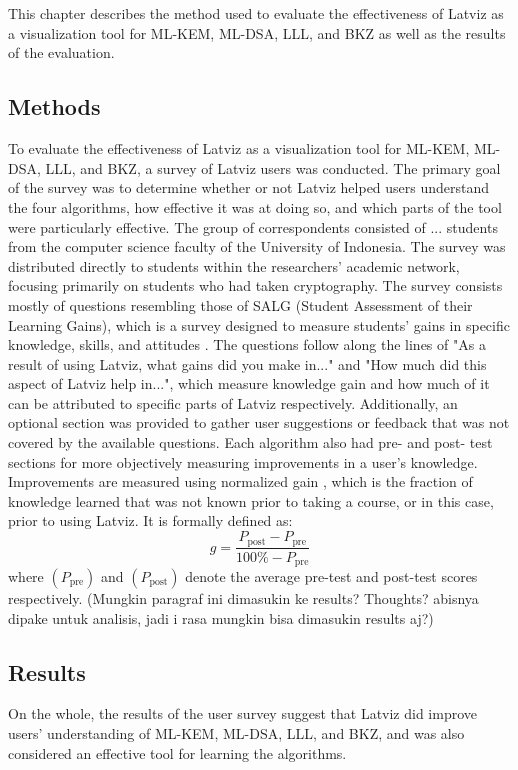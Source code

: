 \chapter{\babEmpat}
\label{bab:4}
This chapter describes the method used to evaluate the effectiveness of Latviz as a visualization tool for ML-KEM, ML-DSA, LLL, and BKZ as well as the results of the evaluation.

\section{Methods}
 To evaluate the effectiveness of Latviz as a visualization tool for ML-KEM, ML-DSA, LLL, and BKZ, a survey of Latviz users was conducted. The primary goal of the survey was to determine whether or not Latviz helped users understand the four algorithms, how effective it was at doing so, and which parts of the tool were particularly effective.
 The group of correspondents consisted of ... students from the computer science faculty of the University of Indonesia. The survey was distributed directly to students within the researchers' academic network, focusing primarily on students who had taken cryptography.
 The survey consists mostly of questions resembling those of SALG (Student Assessment of their Learning Gains), which is a survey designed to measure students' gains in specific knowledge, skills, and attitudes \cite{selfrep}. The questions follow along the lines of "As a result of using Latviz, what gains did you make in..." and "How much did this aspect of Latviz help in...", which measure knowledge gain and how much of it can be attributed to specific parts of Latviz respectively. Additionally, an optional section was provided to gather user suggestions or feedback that was not covered by the available questions.
 Each algorithm also had pre- and post- test sections for more objectively measuring improvements in a user's knowledge. Improvements are measured using normalized gain \cite{PhysRevPhysEducRes}, which is the fraction of knowledge learned that was not known prior to taking a course, or in this case, prior to using Latviz. It is formally defined as:
\[
g = \frac{P_{\text{post}} - P_{\text{pre}}}
{100\% - P_{\text{pre}}}
\]
where $(P_{\mathrm{pre}})$ and $(P_{\mathrm{post}})$ denote the average pre-test and post-test scores respectively.
(Mungkin paragraf ini dimasukin ke results? Thoughts? abisnya dipake untuk analisis, jadi i rasa mungkin bisa dimasukin results aj?)

\section{Results}
On the whole, the results of the user survey suggest that Latviz did improve users' understanding of ML-KEM, ML-DSA, LLL, and BKZ, and was also considered an effective tool for learning the algorithms. 
